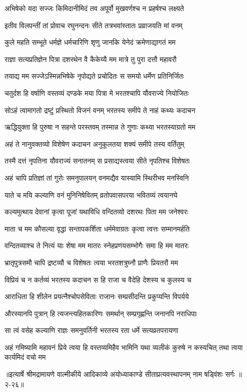 \twolineshloka
{अभिषेको यदा सज्जः किमिदानीमिदं तव}
{अपूर्वो मुखवर्णश्च न प्रहर्षश्च लक्ष्यते} %

\twolineshloka
{इतीव विलपन्तीं तां प्रोवाच रघुनन्दनः}
{सीते तत्रभवांस्तातः प्रव्राजयति मां वनम्} %

\twolineshloka
{कुले महति सम्भूते धर्मज्ञे धर्मचारिणि}
{शृणु जानकि येनेदं क्रमेणाद्यागतं मम} %

\twolineshloka
{राज्ञा सत्यप्रतिज्ञेन पित्रा दशरथेन वै}
{कैकेय्यै मम मात्रे तु पुरा दत्तौ महावरौ} %

\twolineshloka
{तयाद्य मम सज्जेऽस्मिन्नभिषेके नृपोद्यते}
{प्रचोदितः स समयो धर्मेण प्रतिनिर्जितः} %

\twolineshloka
{चतुर्दश हि वर्षाणि वस्तव्यं दण्डके मया}
{पित्रा मे भरतश्चापि यौवराज्ये नियोजितः} %

\twolineshloka
{सोऽहं त्वामागतो द्रष्टुं प्रस्थितो विजनं वनम्}
{भरतस्य समीपे ते नाहं कथ्यः कदाचन} %

\twolineshloka
{ऋद्धियुक्ता हि पुरुषा न सहन्ते परस्तवम्}
{तस्मान्न ते गुणाः कथ्या भरतस्याग्रतो मम} %

\twolineshloka
{अहं ते नानुवक्तव्यो विशेषेण कदाचन}
{अनुकूलतया शक्यं समीपे तस्य वर्तितुम्} %

\twolineshloka
{तस्मै दत्तं नृपतिना यौवराज्यं सनातनम्}
{स प्रसाद्यस्त्वया सीते नृपतिश्च विशेषतः} %

\twolineshloka
{अहं चापि प्रतिज्ञां तां गुरोः समनुपालयन्}
{वनमद्यैव यास्यामि स्थिरीभव मनस्विनि} %

\twolineshloka
{याते च मयि कल्याणि वनं मुनिनिषेवितम्}
{व्रतोपवासपरया भवितव्यं त्वयानघे} %

\twolineshloka
{कल्यमुत्थाय देवानां कृत्वा पूजां यथाविधि}
{वन्दितव्यो दशरथः पिता मम जनेश्वरः} %

\twolineshloka
{माता च मम कौसल्या वृद्धा सन्तापकर्शिता}
{धर्ममेवाग्रतः कृत्वा त्वत्तः सम्मानमर्हति} %

\twolineshloka
{वन्दितव्याश्च ते नित्यं याः शेषा मम मातरः}
{स्नेहप्रणयसम्भोगैः समा हि मम मातरः} %

\twolineshloka
{भ्रातृपुत्रसमौ चापि द्रष्टव्यौ च विशेषतः}
{त्वया भरतशत्रुघ्नौ प्राणैः प्रियतरौ मम} %

\twolineshloka
{विप्रियं च न कर्तव्यं भरतस्य कदाचन}
{स हि राजा च वैदेहि देशस्य च कुलस्य च} %

\twolineshloka
{आराधिता हि शीलेन प्रयत्नैश्चोपसेविताः}
{राजानः सम्प्रसीदन्ति प्रकुप्यन्ति विपर्यये} %

\twolineshloka
{औरस्यानपि पुत्रान् हि त्यजन्त्यहितकारिणः}
{समर्थान् सम्प्रगृह्णन्ति जनानपि नराधिपाः} %

\twolineshloka
{सा त्वं वसेह कल्याणि राज्ञः समनुवर्तिनी}
{भरतस्य रता धर्मे सत्यव्रतपरायणा} %

\twolineshloka
{अहं गमिष्यामि महावनं प्रिये त्वया हि वस्तव्यमिहैव भामिनि}
{यथा व्यलीकं कुरुषे न कस्यचित् तथा त्वया कार्यमिदं वचो मम} %


॥इत्यार्षे श्रीमद्रामायणे वाल्मीकीये आदिकाव्ये अयोध्याकाण्डे सीताप्रत्यवस्थापनम् नाम षड्विंशः सर्गः ॥२-२६॥
